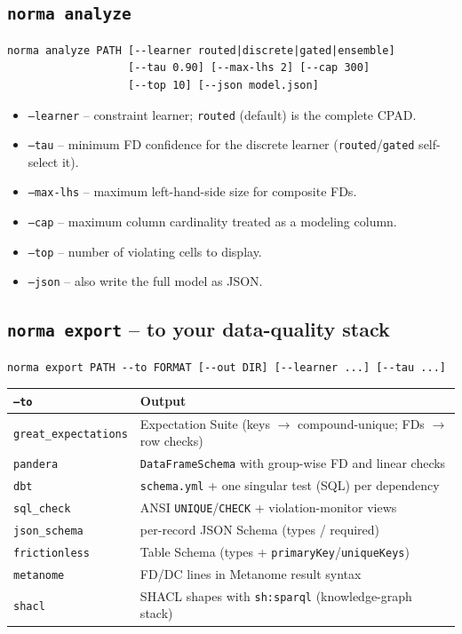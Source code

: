 \documentclass[11pt,a4paper]{article}
\newcommand{\code}[1]{\texttt{#1}}
\begin{document}
\subsection{\code{norma analyze}}
\begin{lstlisting}
norma analyze PATH [--learner routed|discrete|gated|ensemble]
                   [--tau 0.90] [--max-lhs 2] [--cap 300]
                   [--top 10] [--json model.json]
\end{lstlisting}
\begin{itemize}[nosep,leftmargin=1.4em]
  \item \code{--learner} -- constraint learner; \code{routed} (default) is the complete CPAD.
  \item \code{--tau} -- minimum FD confidence for the discrete learner (\code{routed}/\code{gated} self-select it).
  \item \code{--max-lhs} -- maximum left-hand-side size for composite FDs.
  \item \code{--cap} -- maximum column cardinality treated as a modeling column.
  \item \code{--top} -- number of violating cells to display.
  \item \code{--json} -- also write the full model as JSON.
\end{itemize}

\subsection{\code{norma export} -- to your data-quality stack}
\begin{lstlisting}
norma export PATH --to FORMAT [--out DIR] [--learner ...] [--tau ...]
\end{lstlisting}

\begin{center}
\begin{tabular}{@{}ll@{}}
\toprule
\code{--to} & Output \\
\midrule
\code{great\_expectations} & Expectation Suite (keys $\to$ compound-unique; FDs $\to$ row checks) \\
\code{pandera}             & \code{DataFrameSchema} with group-wise FD and linear checks \\
\code{dbt}                 & \code{schema.yml} + one singular test (SQL) per dependency \\
\code{sql\_check}          & ANSI \code{UNIQUE}/\code{CHECK} + violation-monitor views \\
\code{json\_schema}        & per-record JSON Schema (types / required) \\
\code{frictionless}        & Table Schema (types + \code{primaryKey}/\code{uniqueKeys}) \\
\code{metanome}            & FD/DC lines in Metanome result syntax \\
\code{shacl}               & SHACL shapes with \code{sh:sparql} (knowledge-graph stack) \\
\bottomrule
\end{tabular}
\end{center}
\end{document}
